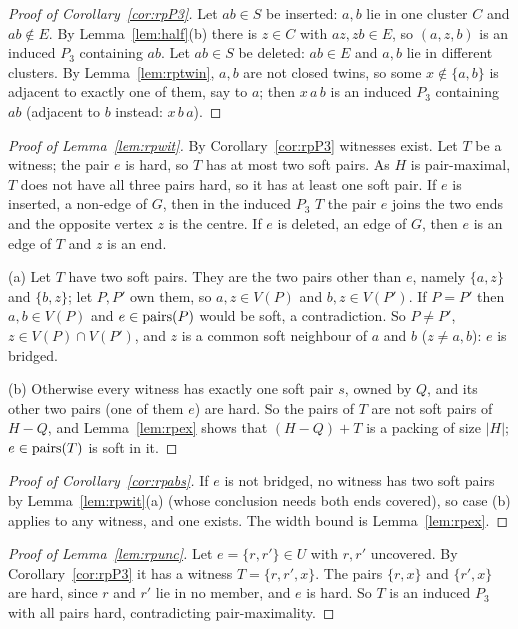 \begin{proof}[Proof of Corollary~\ref{cor:rpP3}]
Let $ab\in S$ be inserted: $a,b$ lie in one cluster $C$ and $ab\notin E$. By Lemma~\ref{lem:half}(b) there is $z\in C$ with $az,zb\in E$, so $(a,z,b)$ is an induced $P_3$ containing $ab$. Let $ab\in S$ be deleted: $ab\in E$ and $a,b$ lie in different clusters. By Lemma~\ref{lem:rptwin}, $a,b$ are not closed twins, so some $x\notin\{a,b\}$ is adjacent to exactly one of them, say to $a$; then $x\,a\,b$ is an induced $P_3$ containing $ab$ (adjacent to $b$ instead: $x\,b\,a$).
\end{proof}

\begin{proof}[Proof of Lemma~\ref{lem:rpwit}]
By Corollary~\ref{cor:rpP3} witnesses exist. Let $T$ be a witness; the pair $e$ is hard, so $T$ has at most two soft pairs. As $H$ is pair-maximal, $T$ does not have all three pairs hard, so it has at least one soft pair. If $e$ is inserted, a non-edge of $G$, then in the induced $P_3$ $T$ the pair $e$ joins the two ends and the opposite vertex $z$ is the centre. If $e$ is deleted, an edge of $G$, then $e$ is an edge of $T$ and $z$ is an end.

(a) Let $T$ have two soft pairs. They are the two pairs other than $e$, namely $\{a,z\}$ and $\{b,z\}$; let $P,P'$ own them, so $a,z\in V(P)$ and $b,z\in V(P')$. If $P=P'$ then $a,b\in V(P)$ and $e\in\mathrm{pairs}(P)$ would be soft, a contradiction. So $P\ne P'$, $z\in V(P)\cap V(P')$, and $z$ is a common soft neighbour of $a$ and $b$ ($z\ne a,b$): $e$ is bridged.

(b) Otherwise every witness has exactly one soft pair $s$, owned by $Q$, and its other two pairs (one of them $e$) are hard. So the pairs of $T$ are not soft pairs of $H-Q$, and Lemma~\ref{lem:rpex} shows that $(H-Q)+T$ is a packing of size $|H|$; $e\in\mathrm{pairs}(T)$ is soft in it.
\end{proof}

\begin{proof}[Proof of Corollary~\ref{cor:rpabs}]
If $e$ is not bridged, no witness has two soft pairs by Lemma~\ref{lem:rpwit}(a) (whose conclusion needs both ends covered), so case (b) applies to any witness, and one exists. The width bound is Lemma~\ref{lem:rpex}.
\end{proof}

\begin{proof}[Proof of Lemma~\ref{lem:rpunc}]
Let $e=\{r,r'\}\in U$ with $r,r'$ uncovered. By Corollary~\ref{cor:rpP3} it has a witness $T=\{r,r',x\}$. The pairs $\{r,x\}$ and $\{r',x\}$ are hard, since $r$ and $r'$ lie in no member, and $e$ is hard. So $T$ is an induced $P_3$ with all pairs hard, contradicting pair-maximality.
\end{proof}

